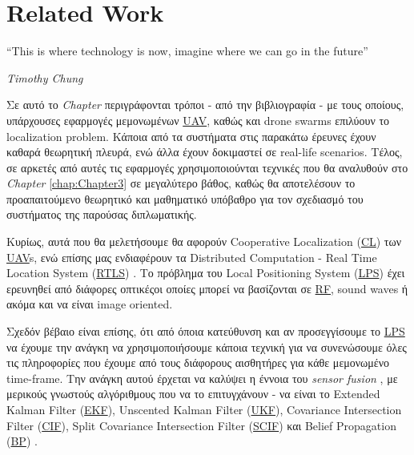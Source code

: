 \chapter{Related Work} \label{chap:Chapter2}       
\epigraph{``This is where technology is now, imagine where we can go in the future” }{\textit{Timothy Chung}}

Σε αυτό το \emph{Chapter} περιγράφονται τρόποι - από την βιβλιογραφία - με τους οποί\-ους, υπάρχουσες εφαρμογές 
μεμονωμένων \hyperref[abbr:UAV]{UAV}, καθώς και drone swarms επιλύουν το localization pro\-blem. Κάποια από τα συστήματα στις παρακάτω έρευνες έχουν καθαρά
θεωρητική πλευρά, ενώ άλλα έχουν δοκιμαστεί σε real-life scenarios.
Τέλος, σε αρκετές από αυτές τις εφαρμογές χρησιμοποιούνται τεχνικές που θα αναλυθούν στο \emph{Chapter} \ref{chap:Chapter3} 
σε μεγαλύτερο βάθος, καθώς θα αποτελέσουν το προαπαιτούμενο θεωρητικό και μαθηματικό υπόβαθρο για τον σχεδιασμό του συστήματος της παρούσας διπλωματικής.

Κυρίως, αυτά που θα μελετήσουμε θα αφορούν Cooperative Localization (\hyperref[abbr:CL]{CL}) των \hyperref[abbr:UAV]{UAV}s, ενώ επίσης
μας ενδιαφέρουν τα Distributed Computation - Real Time Location System (\hyperref[abbr:RTLS]{RTLS}) \cite{rtls}. Το πρόβλημα του Local Positioning System 
(\hyperref[abbr:LPS]{LPS}) \cite{lps} έχει ερευνηθεί από διάφορες οπτικές\udot οι οποίες μπορεί να βασίζονται σε 
\hyperref[abbr:RF]{RF}, sound waves ή ακόμα και να είναι image oriented.

Σχεδόν βέβαιο είναι επίσης, ότι από όποια κατεύθυνση και αν προσεγγίσουμε το \hyperref[abbr:LPS]{LPS} να έχουμε την ανάγκη να 
χρησιμοποιήσουμε κάποια τεχνική για να συνενώσουμε όλες τις πληροφορίες που έχουμε από τους διάφορους αισθητήρες για κάθε μεμονωμένο 
time-frame. Την ανάγκη αυτού έρχεται να καλύψει η έννοια του \emph{sensor fusion} \cite{sensor-fusion}, με μερικούς γνωστούς 
αλγόριθμους που να το επιτυγχάνουν - να είναι το  
Extended Kalman Filter (\hyperref[abbr:EKF]{EKF}), Unscented Kalman Filter (\hyperref[abbr:UKF]{UKF}), Covariance Intersection  
Filter (\hyperref[abbr:CIF]{CIF}),  Split  Covariance  Intersection  Filter (\hyperref[abbr:SCIF]{SCIF}) και  Belief  Propagation 
(\hyperref[abbr:BP]{BP}) \cite{fusion-filters}. 


